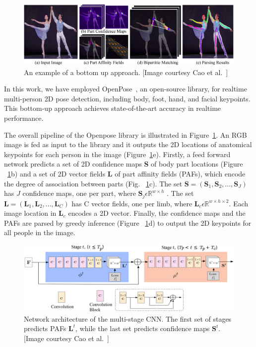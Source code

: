 \begin{figure}
	\centering
	\includegraphics[width=\textwidth]{figures/openpose_bottom_up.eps}
	\caption[An example of a bottom up approach]
	{An example of a bottom up approach. [Image courtesy Cao et al.~\cite{Cao_19}] \label{fig:openpose_bottom_up}}
\end{figure}

In this work, we have employed OpenPose~\cite{Cao_19}, an open-source library, for realtime multi-person 2D pose detection, including body, foot, hand, and facial keypoints. This bottom-up approach achieves state-of-the-art accuracy in realtime performance. 

The overall pipeline of the Openpose library is illustrated in Figure~\ref{fig:openpose_bottom_up}. An RGB image is fed as input to the library and it outputs the 2D locations of anatomical keypoints for each person in the image (Figure~\ref{fig:openpose_bottom_up}e). Firstly, a feed forward network predicts a set of 2D confidence maps \textbf{S} of body part locations (Figure ~\ref{fig:openpose_bottom_up}b) and a set of 2D vector fields \textbf{L} of part affinity fields (PAFs), which encode the degree of association between parts (Fig. ~\ref{fig:openpose_bottom_up}c). The set $\textbf{S} = (\textbf{S}_1,\textbf{S}_2,...,\textbf{S}_J)$ has $ J $ confidence maps, one per part, where $\textbf{S}_j \epsilon \mathbb {R}^{w\times h}$ . The set $\textbf{L}= (\textbf{L}_1,\textbf{L}_2,...,\textbf{L}_C)$ has C vector fields, one per limb, where $\textbf{L}_c \epsilon \mathbb {R}^{w\times h\times 2}$. Each image location in $\textbf{L}_c$ encodes a 2D vector. Finally, the confidence maps and the PAFs are parsed by greedy inference (Figure ~\ref{fig:openpose_bottom_up}d) to output the 2D keypoints for all people in the image.


\begin{figure}
	\centering
	\includegraphics[width=\textwidth]{figures/openpose_architecture.eps}
	\caption[Network architecture of the multi-stage CNN]
	{Network architecture  of  the  multi-stage  CNN.  The  first  set of stages predicts PAFs $\textbf{L}^t$, while the last set predicts confidence  maps $ \textbf{S}^{t}$. [Image courtesy Cao et al.~\cite{Cao_19}] \label{fig:openpose_architecture}}
\end{figure}
